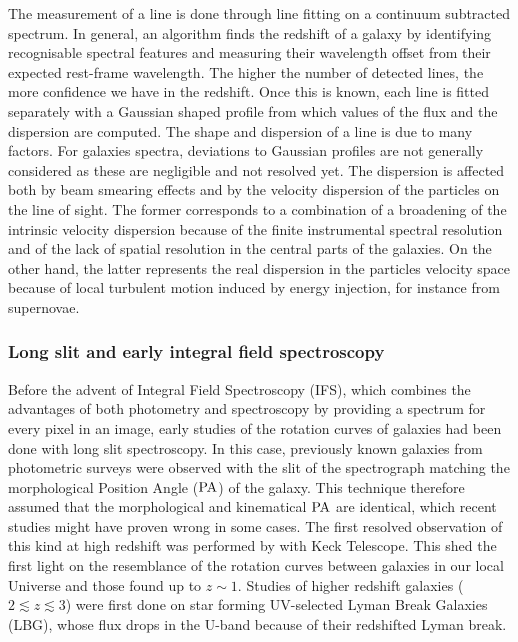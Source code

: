 The measurement of a line is done through line fitting on a continuum subtracted spectrum. In general, an algorithm finds the redshift of a galaxy by identifying recognisable spectral features and measuring their wavelength offset from their expected rest-frame wavelength. The higher the number of detected lines, the more confidence we have in the redshift. Once this is known, each line is fitted separately with a Gaussian shaped profile from which values of the flux and the dispersion are computed. The shape and dispersion of a line is due to many factors. For galaxies spectra, deviations to Gaussian profiles are not generally considered as these are negligible and not resolved yet. The dispersion is affected both by beam smearing effects and by the velocity dispersion of the particles on the line of sight. The former corresponds to a combination of a broadening of the intrinsic velocity dispersion because of the finite instrumental spectral resolution and of the lack of spatial resolution in the central parts of the galaxies. On the other hand, the latter represents the real dispersion in the particles velocity space because of local turbulent motion induced by energy injection, for instance from supernovae. \\


\subsubsection{Long slit and early integral field spectroscopy}
\label{subsubsec:MUSE-VLT}

\begin{wrapfigure}{r}{0.5\linewidth}
	\centering
	\texttt{[image: \{Figures/comp\_redshift\_surveys]}.eps}
	\caption[Redshift distribution of IFS surveys]{Comparison of the redshift distribution of the main IFS surveys mentioned in the text from \shortciteA{Contini2012}.}
\end{wrapfigure}

Before the advent of Integral Field Spectroscopy (IFS), which combines the advantages of both photometry and spectroscopy by providing a spectrum for every pixel in an image, early studies of the rotation curves of galaxies had been done with long slit spectroscopy. In this case, previously known galaxies from photometric surveys were observed with the slit of the spectrograph matching the morphological Position Angle ($\rm{PA}$) of the galaxy. This technique therefore assumed that the morphological and kinematical $\rm{PA}$ are identical, which recent studies might have proven wrong in some cases. The first resolved observation of this kind at high redshift was performed by  with Keck Telescope. This shed the first light on the resemblance of the rotation curves between galaxies in our local Universe and those found up to $z \sim 1$. Studies of higher redshift galaxies ($2 \lesssim z \lesssim 3$) were first done on star forming UV-selected Lyman Break Galaxies (LBG), whose flux drops in the U-band because of their redshifted Lyman break.  \\

